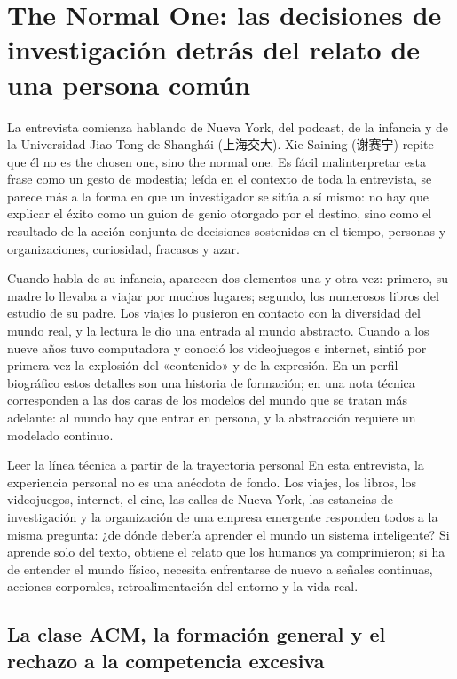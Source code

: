 \section{The Normal One: las decisiones de investigación detrás del relato de una persona común}

La entrevista comienza hablando de Nueva York, del podcast, de la infancia y de la Universidad Jiao Tong de Shanghái (上海交大). Xie Saining (谢赛宁) repite que él no es the chosen one, sino the normal one. Es fácil malinterpretar esta frase como un gesto de modestia; leída en el contexto de toda la entrevista, se parece más a la forma en que un investigador se sitúa a sí mismo: no hay que explicar el éxito como un guion de genio otorgado por el destino, sino como el resultado de la acción conjunta de decisiones sostenidas en el tiempo, personas y organizaciones, curiosidad, fracasos y azar.

Cuando habla de su infancia, aparecen dos elementos una y otra vez: primero, su madre lo llevaba a viajar por muchos lugares; segundo, los numerosos libros del estudio de su padre. Los viajes lo pusieron en contacto con la diversidad del mundo real, y la lectura le dio una entrada al mundo abstracto. Cuando a los nueve años tuvo computadora y conoció los videojuegos e internet, sintió por primera vez la explosión del «contenido» y de la expresión. En un perfil biográfico estos detalles son una historia de formación; en una nota técnica corresponden a las dos caras de los modelos del mundo que se tratan más adelante: al mundo hay que entrar en persona, y la abstracción requiere un modelado continuo.

\begin{knowledgebox}{Leer la línea técnica a partir de la trayectoria personal}
En esta entrevista, la experiencia personal no es una anécdota de fondo. Los viajes, los libros, los videojuegos, internet, el cine, las calles de Nueva York, las estancias de investigación y la organización de una empresa emergente responden todos a la misma pregunta: ¿de dónde debería aprender el mundo un sistema inteligente? Si aprende solo del texto, obtiene el relato que los humanos ya comprimieron; si ha de entender el mundo físico, necesita enfrentarse de nuevo a señales continuas, acciones corporales, retroalimentación del entorno y la vida real.
\end{knowledgebox}

\subsection{La clase ACM, la formación general y el rechazo a la competencia excesiva}

